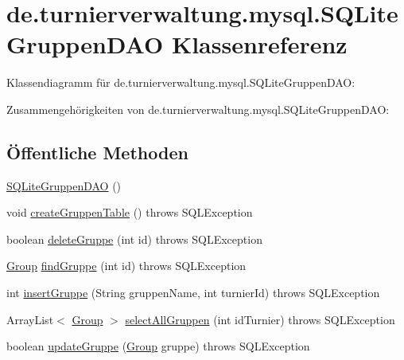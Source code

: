 \hypertarget{classde_1_1turnierverwaltung_1_1mysql_1_1_s_q_lite_gruppen_d_a_o}{}\section{de.\+turnierverwaltung.\+mysql.\+S\+Q\+Lite\+Gruppen\+D\+AO Klassenreferenz}
\label{classde_1_1turnierverwaltung_1_1mysql_1_1_s_q_lite_gruppen_d_a_o}


Klassendiagramm für de.\+turnierverwaltung.\+mysql.\+S\+Q\+Lite\+Gruppen\+D\+AO\+:


Zusammengehörigkeiten von de.\+turnierverwaltung.\+mysql.\+S\+Q\+Lite\+Gruppen\+D\+AO\+:
\subsection*{Öffentliche Methoden}
\begin{DoxyCompactItemize}
\item 
\hyperlink{classde_1_1turnierverwaltung_1_1mysql_1_1_s_q_lite_gruppen_d_a_o_a16f46ce6e5c04743d00d081e3b50f06f}{S\+Q\+Lite\+Gruppen\+D\+AO} ()
\item 
void \hyperlink{classde_1_1turnierverwaltung_1_1mysql_1_1_s_q_lite_gruppen_d_a_o_a1c936cdc3b4ecf2df618f8a11674a325}{create\+Gruppen\+Table} ()  throws S\+Q\+L\+Exception 
\item 
boolean \hyperlink{classde_1_1turnierverwaltung_1_1mysql_1_1_s_q_lite_gruppen_d_a_o_abb00c008470bd980a76b9250260499a3}{delete\+Gruppe} (int id)  throws S\+Q\+L\+Exception 
\item 
\hyperlink{classde_1_1turnierverwaltung_1_1model_1_1_group}{Group} \hyperlink{classde_1_1turnierverwaltung_1_1mysql_1_1_s_q_lite_gruppen_d_a_o_aadee41df098237ee8fa45462d19edb6b}{find\+Gruppe} (int id)  throws S\+Q\+L\+Exception 
\item 
int \hyperlink{classde_1_1turnierverwaltung_1_1mysql_1_1_s_q_lite_gruppen_d_a_o_a6c7e2f9a7671c5f8b1207b2b79b99725}{insert\+Gruppe} (String gruppen\+Name, int turnier\+Id)  throws S\+Q\+L\+Exception 
\item 
Array\+List$<$ \hyperlink{classde_1_1turnierverwaltung_1_1model_1_1_group}{Group} $>$ \hyperlink{classde_1_1turnierverwaltung_1_1mysql_1_1_s_q_lite_gruppen_d_a_o_a036d41772361fb7e62c10be4cd5b76f2}{select\+All\+Gruppen} (int id\+Turnier)  throws S\+Q\+L\+Exception 
\item 
boolean \hyperlink{classde_1_1turnierverwaltung_1_1mysql_1_1_s_q_lite_gruppen_d_a_o_aa1640b18e1708c3b817a939e76c0d052}{update\+Gruppe} (\hyperlink{classde_1_1turnierverwaltung_1_1model_1_1_group}{Group} gruppe)  throws S\+Q\+L\+Exception 
\end{DoxyCompactItemize}


